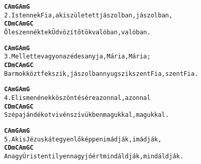 \begin{minipage}{\textwidth}
\kottastart
{}
\kottaend
\begin{minipage}{\textwidth}
\begin{alltt}
\textbf{   C                            Am    G    Am    G}
2. Istennek Fia, aki született jászolban, jászolban,
\textbf{   C               Dm           C   Am   G   C}
   Ő leszen néktek Üdvözítőtök valóban, valóban.
\end{alltt}
\vspace{0.0cm}
\versszakspacing
\end{minipage}
\begin{minipage}{\textwidth}
\begin{alltt}
\textbf{    C                             Am G   Am G}
3. Mellette vagyon az édesanyja, Mária, Mária;
\textbf{    C                    Dm                  C     Am   G     C}
   Barmok közt fekszik, jászolban nyugszik szent Fia, szent Fia.
\end{alltt}
\vspace{0.0cm}
\versszakspacing
\end{minipage}
\begin{minipage}{\textwidth}
\begin{alltt}
\textbf{   C                          Am   G   Am   G}
4. El is menének köszöntésére azonnal, azonnal
\textbf{     C             Dm              C    Am   G    C}
   Szép ajándékot vivén szívükben magukkal, magukkal.
\end{alltt}
\vspace{0.0cm}
\versszakspacing
\end{minipage}
\begin{minipage}{\textwidth}
\begin{alltt}
\textbf{   C                            Am   G   Am   G}
5. A kis Jézuskát egyenlőképpen imádják, imádják,
\textbf{   C               Dm                C       Am   G       C}
   A nagy Úristent ilyen nagy jóért mind áldják, mind áldják.
\end{alltt}
\vspace{0.0cm}
\versszakspacing
\end{minipage}
\end{minipage}
~\vspace{1.0cm}
\newline
